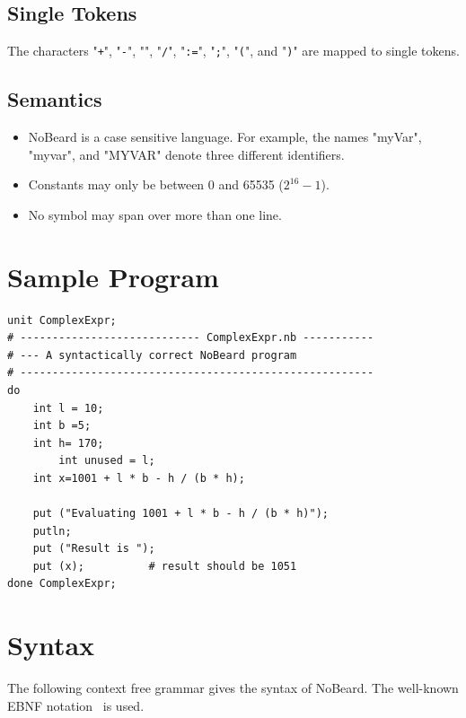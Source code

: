 \documentclass[11pt]{report}
\newcommand{\leongage}{NoBeard}
\begin{document}
\subsection{Single Tokens}
The characters "{\tt+}", "{\tt-}", "{\tt*}", "{\tt/}", "{\tt:=}", "{\tt;}", "{\tt(}", and "{\tt)}" are mapped to single tokens.

\subsection{Semantics}
\begin{itemize}
	\item \leongage{} is a case sensitive language. For example, the names "myVar", "myvar", and "MYVAR" denote three different identifiers.
	\item Constants may only be between 0 and 65535 ($2^{16} - 1$).
	\item No symbol may span over more than one line.
\end{itemize}

\section{Sample Program}
\begin{lstlisting}
unit ComplexExpr;
# ---------------------------- ComplexExpr.nb -----------
# --- A syntactically correct NoBeard program
# -------------------------------------------------------
do
    int l = 10;
    int b =5;
    int h= 170;
        int unused = l;
    int x=1001 + l * b - h / (b * h);

    put ("Evaluating 1001 + l * b - h / (b * h)");
    putln;
    put ("Result is ");
    put (x);          # result should be 1051
done ComplexExpr;
\end{lstlisting}

\section{Syntax}
The following context free grammar gives the syntax of \leongage{}. The well-known EBNF notation~\cite{wirth_what_1977} is used.
\end{document}
